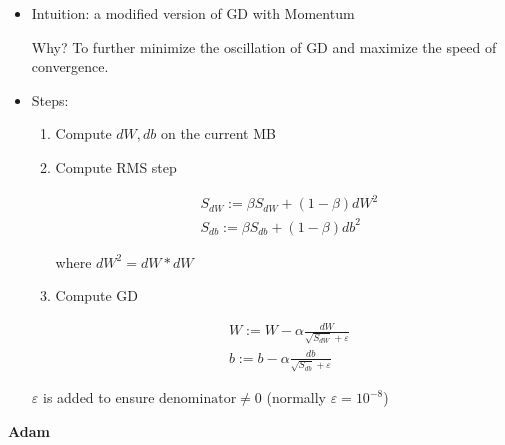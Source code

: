 \documentclass[
]{book}
\begin{document}
\begin{itemize}
\item
  Intuition: a modified version of GD with Momentum

  Why? To further minimize the oscillation of GD and maximize the speed
  of convergence.
\item
  Steps:

  \begin{enumerate}
  \def\labelenumi{\arabic{enumi}.}
  \item
    Compute \(dW,db\) on the current MB
  \item
    Compute RMS step

    \[\begin{align}
     &S_{dW}:=\beta S_{dW}+(1-\beta)dW^2 \\
     &S_{db}:=\beta S_{db}+(1-\beta)db^2
     \end{align}\]

    where \(dW^2=dW* dW\)
  \item
    Compute GD

    \[\begin{align}
     &W:=W-\alpha \frac{dW}{\sqrt{S_{dW}}+\varepsilon} \\
     &b:=b-\alpha \frac{db}{\sqrt{S_{db}}+\varepsilon}
     \end{align}\]
  \end{enumerate}

  \(\varepsilon\) is added to ensure \(\text{denominator}\neq0\)
  (normally \(\varepsilon=10^{-8}\))
\end{itemize}

\textbf{Adam}
\end{document}
